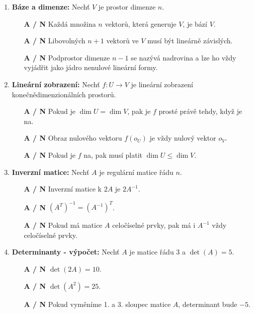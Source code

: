 \documentclass[a4paper,11pt]{article}
\begin{document}
\begin{enumerate}
    \item \textbf{Báze a dimenze:} Nechť $V$ je prostor dimenze $n$.
    \begin{itemize}
        \item[\textbf{A / N}] Každá množina $n$ vektorů, která generuje $V$, je bází $V$.
        \item[\textbf{A / N}] Libovolných $n+1$ vektorů ve $V$ musí být lineárně závislých.
        \item[\textbf{A / N}] Podprostor dimenze $n-1$ se nazývá nadrovina a lze ho vždy vyjádřit jako jádro nenulové lineární formy.
    \end{itemize}

    \item \textbf{Lineární zobrazení:} Nechť $f: U \to V$ je lineární zobrazení konečnědimenzionálních prostorů.
    \begin{itemize}
        \item[\textbf{A / N}] Pokud je $\dim U = \dim V$, pak je $f$ prosté právě tehdy, když je na.
        \item[\textbf{A / N}] Obraz nulového vektoru $f(o_U)$ je vždy nulový vektor $o_V$.
        \item[\textbf{A / N}] Pokud je $f$ na, pak musí platit $\dim U \le \dim V$.
    \end{itemize}

    \item \textbf{Inverzní matice:} Nechť $A$ je regulární matice řádu $n$.
    \begin{itemize}
        \item[\textbf{A / N}] Inverzní matice k $2A$ je $2A^{-1}$.
        \item[\textbf{A / N}] $(A^T)^{-1} = (A^{-1})^T$.
        \item[\textbf{A / N}] Pokud má matice $A$ celočíselné prvky, pak má i $A^{-1}$ vždy celočíselné prvky.
    \end{itemize}

    \item \textbf{Determinanty - výpočet:} Nechť $A$ je matice řádu $3$ a $\det(A) = 5$.
    \begin{itemize}
        \item[\textbf{A / N}] $\det(2A) = 10$.
        \item[\textbf{A / N}] $\det(A^2) = 25$.
        \item[\textbf{A / N}] Pokud vyměníme 1. a 3. sloupec matice $A$, determinant bude $-5$.
    \end{itemize}


\end{enumerate}
\end{document}
